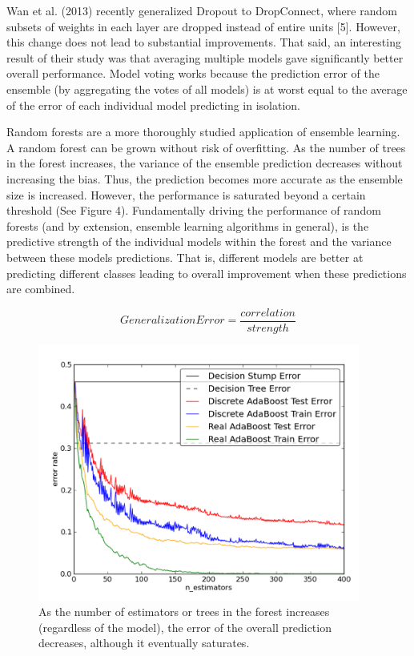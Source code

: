 \documentclass{article} %
\begin{document}
Wan et al. (2013) recently generalized Dropout to DropConnect, where random subsets of weights in each layer are dropped instead of entire units [5]. However, this change does not lead to substantial improvements. That said, an interesting result of their study was that averaging multiple models gave significantly better overall performance. Model voting works because the prediction error of the ensemble (by aggregating the votes of all models) is at worst equal to the average of the error of each individual model predicting in isolation.

Random forests are a more thoroughly studied application of ensemble learning. A random forest can be grown without risk of overfitting. As the number of trees in the forest increases, the variance of the ensemble prediction decreases without increasing the bias. Thus, the prediction becomes more accurate as the ensemble size is increased. However, the performance is saturated beyond a certain threshold (See Figure 4). Fundamentally driving the performance of random forests (and by extension, ensemble learning algorithms in general), is the predictive strength of the individual models within the forest and the variance between these models predictions. That is, different models are better at predicting different classes leading to overall improvement when these predictions are combined.

\begin{equation*}
	Generalization Error = \frac{correlation}{strength}
\end{equation*}

\begin{figure}[h!]
\begin{center}
\includegraphics[width=300pt]{RandomForest_Graph.png}
\caption{As the number of estimators or trees in the forest increases (regardless of the model), the error of the overall prediction decreases, although it eventually saturates.}
\end{center}
\end{figure}
\end{document}
